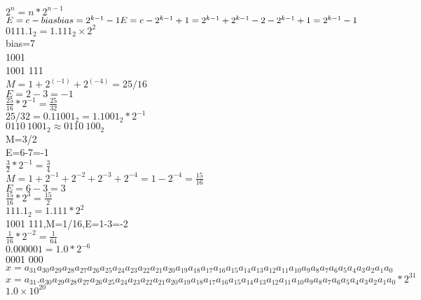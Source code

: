 \documentclass{article}
\begin{document}
\begin{CJK}{UTF8}{gbsn}
\begin{math}
	2^n=n*2^{n-1}
\end{math}	\\[3ex]
\begin{math}
	E=e-bias	\\
	bias=2^{k-1}-1	\\
	E=e-2^{k-1}+1	\\
	=2^{k-1}+2^{k-1}-2-2^{k-1}+1	\\
	=2^{k-1}-1
\end{math}	\\
$0111.1_2=1.111_{2}\times 2^2$	\\
bias=7	\\
1001	\\
1001 111	\\[2ex]
$M=1+2^(-1)+2^(-4)=25/16$	\\
$E=2-3=-1$	\\
$\frac{25}{16}*2^{-1}=\frac{25}{32}$	\\
$25/32=0.11001_2=1.1001_2*2^{-1}$	\\
$0110\ 1001_2\approx 0110\ 100_2$	\\
M=3/2	\\
E=6-7=-1	\\
$\frac{3}{2}*2^{-1}=\frac{3}{4}$	\\
$M=1+2^{-1}+2^{-2}+2^{-3}+2^{-4}=1-2^{-4}=\frac{15}{16}$	\\
$E=6-3=3$	\\
$\frac{15}{16}*2^3=\frac{15}{2}$	\\
$111.1_2=1.111*2^2$	\\
1001 111,M=1/16,E=1-3=-2	\\
$\frac{1}{16}*2^{-2}=\frac{1}{64}$	\\
$0.000001=1.0*2^{-6}$	\\
0001 000	\\
$x=a_{31}a_{30}a_{29}a_{28}a_{27}a_{26}a_{25}a_{24}a_{23}a_{22}a_{21}a_{20}a_{19}a_{18}a_{17}a_{16}a_{15}a_{14}a_{13}a_{12}a_{11}a_{10}a_{9}a_{8}a_{7}a_{6}a_{5}a_{4}a_{3}a_{2}a_{1}a_{0}$	\\
$x=a_{31}.a_{30}a_{29}a_{28}a_{27}a_{26}a_{25}a_{24}a_{23}a_{22}a_{21}a_{20}a_{19}a_{18}a_{17}a_{16}a_{15}a_{14}a_{13}a_{12}a_{11}a_{10}a_{9}a_{8}a_{7}a_{6}a_{5}a_{4}a_{3}a_{2}a_{1}a_{0}*2^{31}$	\\
$1.0\times10^{ 20 }$	\\




\end{CJK}
\end{document}
